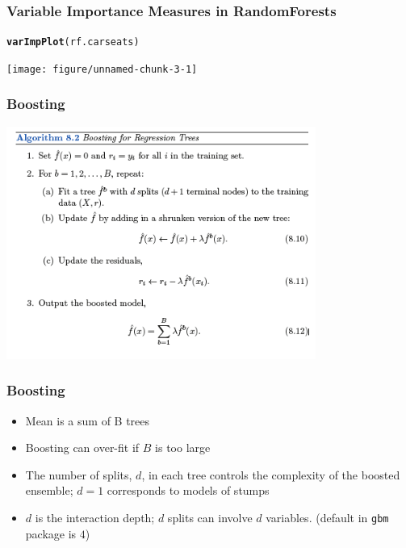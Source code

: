 \documentclass[]{beamer}\usepackage[]{graphicx}\usepackage[]{color}
\makeatletter
\newcommand{\hlstd}[1]{\textcolor[rgb]{0.345,0.345,0.345}{#1}}%
\newcommand{\hlkwd}[1]{\textcolor[rgb]{0.737,0.353,0.396}{\textbf{#1}}}%
\newenvironment{kframe}{%
 \def\at@end@of@kframe{}%
 \ifinner\ifhmode%
  \def\at@end@of@kframe{\end{minipage}}%
  \begin{minipage}{\columnwidth}%
 \fi\fi%
 \def\FrameCommand##1{\hskip\@totalleftmargin \hskip-\fboxsep
 \colorbox{shadecolor}{##1}\hskip-\fboxsep
     \hskip-\linewidth \hskip-\@totalleftmargin \hskip\columnwidth}%
 \MakeFramed {\advance\hsize-\width
   \@totalleftmargin\z@ \linewidth\hsize
   \@setminipage}}%
 {\par\unskip\endMakeFramed%
 \at@end@of@kframe}
\newenvironment{knitrout}{}{} %
\makeatother
\begin{document}
\begin{frame} \frametitle{Variable Importance Measures in RandomForests}
\begin{knitrout}
\color{fgcolor}\begin{kframe}
\begin{alltt}
\hlkwd{varImpPlot}\hlstd{(rf.carseats)}
\end{alltt}
\end{kframe}

{\centering \texttt{[image: figure/unnamed-chunk-3-1]} 

}



\end{knitrout}

\end{frame}


\begin{frame}  \frametitle{Boosting}
\includegraphics[height=3in]{boostingAlgo}

\end{frame}

\begin{frame}
  \frametitle{Boosting }
  \begin{itemize}
  \item Mean is a sum of B trees  \pause
  \item Boosting can over-fit if $B$ is too large  \pause
  \item The number of splits, $d$, in each tree controls  the complexity of the boosted ensemble; $d = 1$ corresponds to models of stumps  \pause
\item $d$ is the interaction depth; $d$ splits can involve $d$ variables.  (default in {\tt gbm} package is $4$)  \pause
  \end{itemize}
\end{frame}
\end{document}
